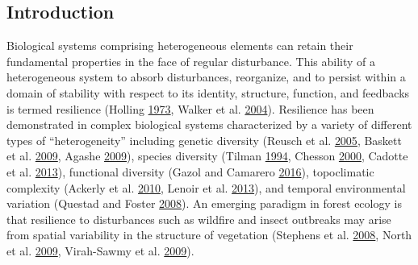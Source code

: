 \documentclass[twoside,12pt,final]{ucthesis-CA2012}
\begin{document}
\begin{ucmainmatter}
\section{Introduction}\label{introduction}

Biological systems comprising heterogeneous elements can retain their
fundamental properties in the face of regular disturbance. This ability
of a heterogeneous system to absorb disturbances, reorganize, and to
persist within a domain of stability with respect to its identity,
structure, function, and feedbacks is termed resilience (Holling
\protect\hyperlink{ref-holling1973}{1973}, Walker et al.
\protect\hyperlink{ref-walker2004}{2004}). Resilience has been
demonstrated in complex biological systems characterized by a variety of
different types of ``heterogeneity'' including genetic diversity (Reusch
et al. \protect\hyperlink{ref-reusch2005}{2005}, Baskett et al.
\protect\hyperlink{ref-baskett2009}{2009}, Agashe
\protect\hyperlink{ref-agashe2009}{2009}), species diversity (Tilman
\protect\hyperlink{ref-tilman1994}{1994}, Chesson
\protect\hyperlink{ref-chesson2000}{2000}, Cadotte et al.
\protect\hyperlink{ref-cadotte2013}{2013}), functional diversity (Gazol
and Camarero \protect\hyperlink{ref-gazol2016}{2016}), topoclimatic
complexity (Ackerly et al. \protect\hyperlink{ref-ackerly2010}{2010},
Lenoir et al. \protect\hyperlink{ref-lenoir2013}{2013}), and temporal
environmental variation (Questad and Foster
\protect\hyperlink{ref-questad2008}{2008}). An emerging paradigm in
forest ecology is that resilience to disturbances such as wildfire and
insect outbreaks may arise from spatial variability in the structure of
vegetation (Stephens et al. \protect\hyperlink{ref-stephens2008}{2008},
North et al. \protect\hyperlink{ref-north2009a}{2009}, Virah-Sawmy et
al. \protect\hyperlink{ref-virah-sawmy2009}{2009}).


\end{ucmainmatter}
\end{document}

